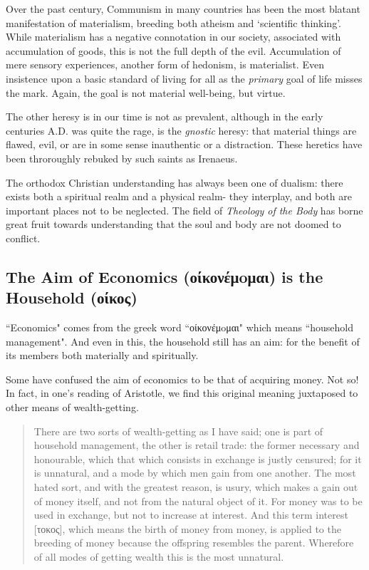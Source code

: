 \documentclass[letterpaper]{article}
\begin{document}
Over the past century, Communism in many countries has been the most blatant manifestation of materialism, breeding both atheism and `scientific thinking'. While materialism has a negative connotation in our society, associated with accumulation of goods, this is not the full depth of the evil. Accumulation of mere sensory experiences, another form of hedonism, is materialist. Even insistence upon a basic standard of living for all as the \textit{primary} goal of life misses the mark. Again, the goal is not material well-being, but virtue.

The other heresy is in our time is not as prevalent, although in the early centuries A.D. was quite the rage, is the \textit{gnostic} heresy: that material things are flawed, evil, or are in some sense inauthentic or a distraction. These heretics have been throroughly rebuked by such saints as Irenaeus.


The orthodox Christian understanding has always been one of dualism: there exists both a spiritual realm and a physical realm- they interplay, and both are important places not to be neglected. The field of \textit{Theology of the Body} has borne great fruit towards understanding that the soul and body are not doomed to conflict.


\subsection{The Aim of Economics (οίκονέμoμαι) is the Household (οίκος)}

``Economics" comes from the greek word ``οίκονέμoμαι" which means ``household management". And even in this, the household still has an aim: for the benefit of its members both materially and spiritually.

Some have confused the aim of economics to be that of acquiring money. Not so! In fact, in one's reading of Aristotle, we find this original meaning juxtaposed to other means of wealth-getting.

\begin{quote}
  There are two sorts of wealth-getting as I have said; one is part of household management, the other is retail trade: the former necessary and honourable, which that which consists in exchange is justly censured; for it is unnatural, and a mode by which men gain from one another. The most hated sort, and with the greatest reason, is usury, which makes a gain out of money itself, and not from the natural object of it. For money was to be used in exchange, but not to increase at interest. And this term interest [τοκος], which means the birth of money from money, is applied to the breeding of money because the offspring resembles the parent. Wherefore of all modes of getting wealth this is the most unnatural.
\end{quote}
\end{document}
